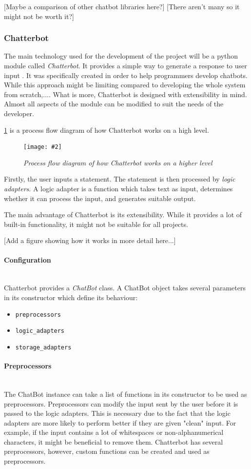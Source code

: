 \documentclass[12pt,a4paper]{article}
\newcommand{\myparagraph}[1]{\paragraph{#1}\mbox{}\\} %
\newcommand{\figuremacro}[5]{
    \begin{figure}[#1]
        \centering
        \texttt{[image: \#2]}
        \caption[#3]{\textbf{#3}#4}
        \label{fig:#2}
    \end{figure}
}
\begin{document}
[Maybe a comparison of other chatbot libraries here?]
[There aren't many so it might not be worth it?]

\subsubsection{Chatterbot}
The main technology used for the development of the project will be a python module called \textit{Chatterbot}. It provides a simple way to generate a response to user input \cite{Chatterbot:online}. It was specifically created in order to help programmers develop chatbots. While this approach might be limiting compared to developing the whole system from scratch,.... What is more, Chatterbot is designed with extensibility in mind. Almost all aspects of the module can be modified to suit the needs of the developer.

\cref{fig:chatterbot-process-flow} is a process flow diagram of how Chatterbot works on a high level.

\figuremacro{h}{chatterbot-process-flow}{}{\small{\textit{Process flow diagram of how Chatterbot works on a higher level \cite{Chatterbot:online}}}}{0.6}  

Firstly, the user inputs a statement. The statement is then processed by \textit{logic adapters}. A logic adapter is a function which takes text as input, determines whether it can process the input, and generates suitable output. 

The main advantage of Chatterbot is its extensibility. While it provides a lot of built-in functionality, it might not be suitable for all projects. 

[Add a figure showing how it works in more detail here...]

\myparagraph{Configuration}
Chatterbot provides a \textit{ChatBot} class. A ChatBot object takes several parameters in its constructor which define its behaviour:
\begin{itemize}
    \item \texttt{preprocessors}
    \item \texttt{logic\_adapters}
    \item \texttt{storage\_adapters}
\end{itemize}

\myparagraph{Preprocessors}
The ChatBot instance can take a list of functions in its constructor to be used as preprocessors. Preprocessors can modify the input sent by the user before it is passed to the logic adapters. This is necessary due to the fact that the logic adapters are more likely to perform better if they are given "clean" input. For example, if the input contains a lot of whitespaces or non-alphanumerical characters, it might be beneficial to remove them. Chatterbot has several preprocessors, however, custom functions can be created and used as preprocessors.
\end{document}
